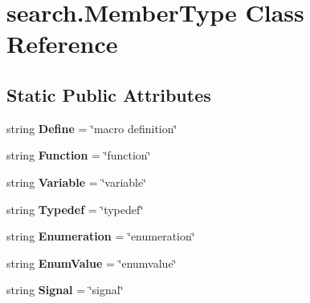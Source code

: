 \hypertarget{classsearch_1_1_member_type}{}\section{search.\+Member\+Type Class Reference}
\label{classsearch_1_1_member_type}
\subsection*{Static Public Attributes}
\begin{DoxyCompactItemize}
\item 
\mbox{\label{classsearch_1_1_member_type_aa908a50d2f305c3e16c6a4213fe9dfc2}} 
string {\bfseries Define} = \char`\"{}macro definition\char`\"{}
\item 
\mbox{\label{classsearch_1_1_member_type_afd4c12694259e08f7ee33caa6b8f9d00}} 
string {\bfseries Function} = \char`\"{}function\char`\"{}
\item 
\mbox{\label{classsearch_1_1_member_type_a1e9433d973bbf07cfc858ed42ad52bd8}} 
string {\bfseries Variable} = \char`\"{}variable\char`\"{}
\item 
\mbox{\label{classsearch_1_1_member_type_a59b1f547a2eb59d07b2cc49c495b4480}} 
string {\bfseries Typedef} = \char`\"{}typedef\char`\"{}
\item 
\mbox{\label{classsearch_1_1_member_type_ac21b740670962db652154a4e4852db7a}} 
string {\bfseries Enumeration} = \char`\"{}enumeration\char`\"{}
\item 
\mbox{\label{classsearch_1_1_member_type_a3c01f493d3472fbe18f9271dbb0260cf}} 
string {\bfseries Enum\+Value} = \char`\"{}enumvalue\char`\"{}
\item 
\mbox{\label{classsearch_1_1_member_type_afb8879a499419119f69fda5eb967bd12}} 
string {\bfseries Signal} = \char`\"{}signal\char`\"{}
\item 
\mbox{\label{classsearch_1_1_member_type_ab7f9da8a73b9e4cd90f07cd7f3eb8d8c}} 

\end{DoxyCompactItemize}
